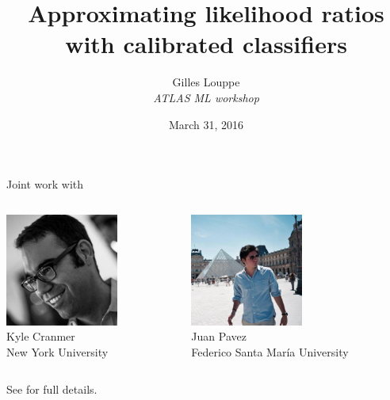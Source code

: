 \documentclass{beamer}
\title{{\bf Approximating likelihood ratios with calibrated classifiers}}
\author{
Gilles Louppe\\
{\it ATLAS ML workshop}
}
\date{March 31, 2016}
\let\oldcitep=\citep
\renewcommand\citep[1]{\hyperlink{#1}{\oldcitep{#1}}}
\begin{document}
\begin{frame}[plain]
\titlepage
\end{frame}

\begin{frame}
    \centering
    Joint work with
    \vspace{2em}

    \begin{columns}
      \begin{column}[t]{0.45\textwidth}
        \centering
        \includegraphics[height=10em]{figures/kyle.jpg}\\
        Kyle Cranmer\\
        {\scriptsize New York University}
      \end{column}
      \begin{column}[t]{0.45\textwidth}
          \centering
          \includegraphics[height=10em]{figures/juan.jpg}\\
          Juan Pavez\\
          {\scriptsize Federico Santa Mar\'ia University}
      \end{column}
    \end{columns}

    \vspace{2em}

    See \citep{cranmer2015approximating} for full details.
\end{frame}
\end{document}
